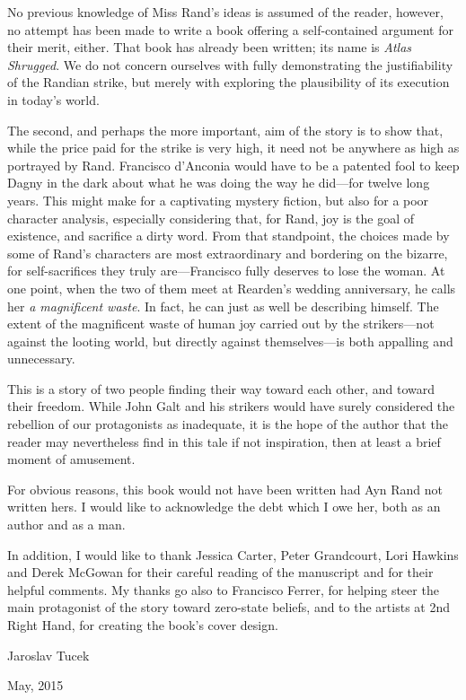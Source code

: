 No previous knowledge of Miss Rand's ideas is assumed of the reader, however, no attempt has been made to write a book offering a self-contained argument for their merit, either. That book has already been written; its name is \emph{Atlas Shrugged}. We do not concern ourselves with fully demonstrating the justifiability of the Randian strike, but merely with exploring the plausibility of its execution in today's world.

The second, and perhaps the more important, aim of the story is to show that, while the price paid for the strike is very high, it need not be anywhere as high as portrayed by Rand. Francisco d'Anconia would have to be a patented fool to keep Dagny in the dark about what he was doing the way he did---for twelve long years. This might make for a captivating mystery fiction, but also for a poor character analysis, especially considering that, for Rand, joy is the goal of existence, and sacrifice a dirty word. From that standpoint, the choices made by some of Rand's characters are most extraordinary and bordering on the bizarre, for self-sacrifices they truly are---Francisco fully deserves to lose the woman. At one point, when the two of them meet at Rearden's wedding anniversary, he calls her \emph{a magnificent waste}. In fact, he can just as well be describing himself. The extent of the magnificent waste of human joy carried out by the strikers---not against the looting world, but directly against themselves---is both appalling and unnecessary.

This is a story of two people finding their way toward each other, and toward their freedom. While John Galt and his strikers would have surely considered the rebellion of our protagonists as inadequate, it is the hope of the author that the reader may nevertheless find in this tale if not inspiration, then at least a brief moment of amusement.

For obvious reasons, this book would not have been written had Ayn Rand not written hers. I would like to acknowledge the debt which I owe her, both as an author and as a man.

In addition, I would like to thank Jessica Carter, Peter Grandcourt, Lori Hawkins and Derek McGowan for their careful reading of the manuscript and for their helpful comments. My thanks go also to Francisco Ferrer, for helping steer the main protagonist of the story toward zero-state beliefs, and to the artists at 2nd Right Hand, for creating the book's cover design.

\begin{flushright}
Jaroslav Tucek

May, 2015
\end{flushright}

